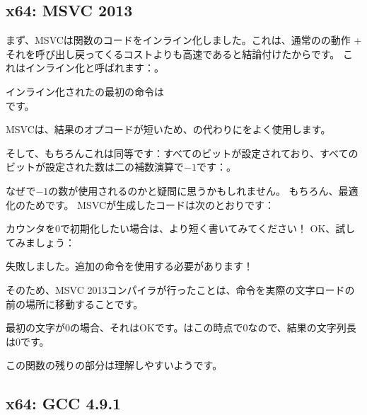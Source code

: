 ﻿\subsection{x64: \Optimizing MSVC 2013}



まず、MSVCは\strlen{}関数のコードをインライン化しました。これは、通常の\strlen{}の動作 + それを呼び出し戻ってくるコストよりも高速であると結論付けたからです。
これはインライン化と呼ばれます：。

\label{using_OR_instead_of_MOV}
インライン化された\strlen{}の最初の命令は\\
です。

MSVCは、結果のオプコードが短いため、の代わりにをよく使用します。

そして、もちろんこれは同等です：すべてのビットが設定されており、すべてのビットが設定された数は二の補数演算で$-1$です：。

なぜ\strlen{}で$-1$の数が使用されるのかと疑問に思うかもしれません。
もちろん、最適化のためです。
MSVCが生成したコードは次のとおりです：



カウンタを0で初期化したい場合は、より短く書いてみてください！
OK、試してみましょう：



失敗しました。追加の命令を使用する必要があります！

そのため、MSVC 2013コンパイラが行ったことは、命令を実際の文字ロードの前の場所に移動することです。

最初の文字が0の場合、それはOKです。\RAX はこの時点で0なので、結果の文字列長は0です。

この関数の残りの部分は理解しやすいようです。

\subsection{x64: \NonOptimizing GCC 4.9.1}



